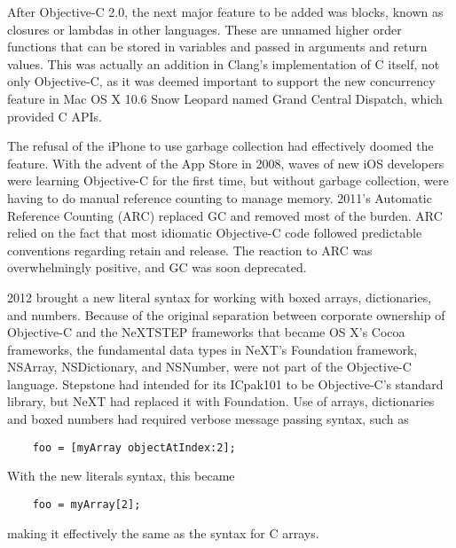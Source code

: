 \documentclass[acmsmall,screen]{acmart}
\begin{document}
After Objective-C 2.0, the next major feature to be added was blocks, known as closures or lambdas in other languages. These are unnamed higher order functions that can be stored in variables and passed in arguments and return values. This was actually an addition in Clang's implementation of C itself, not only Objective-C, as it was deemed important to support the new concurrency feature in Mac OS X 10.6 Snow Leopard named Grand Central Dispatch, which provided C APIs.

The refusal of the iPhone to use garbage collection had effectively doomed the feature. With the advent of the App Store in 2008, waves of new iOS developers were learning Objective-C for the first time, but without garbage collection, were having to do manual reference counting to manage memory. 2011's Automatic Reference Counting (ARC) replaced GC and removed most of the burden. ARC relied on the fact that most idiomatic Objective-C code followed predictable conventions regarding retain and release. The reaction to ARC was overwhelmingly positive, and GC was soon deprecated. 

2012 brought a new literal syntax for working with boxed arrays, dictionaries, and numbers. Because of the original separation between corporate ownership of Objective-C and the NeXTSTEP frameworks that became OS X's Cocoa frameworks, the fundamental data types in NeXT's Foundation framework, NSArray, NSDictionary, and NSNumber, were not part of the Objective-C language. Stepstone had intended for its ICpak101 to be Objective-C's standard library, but NeXT had replaced it with Foundation. Use of arrays, dictionaries and boxed numbers had required verbose message passing syntax, such as 
\begin{verbatim}
    foo = [myArray objectAtIndex:2];
\end{verbatim}
With the new literals syntax, this became 
\begin{verbatim}
    foo = myArray[2];
\end{verbatim}
making it effectively the same as the syntax for C arrays.
\end{document}
